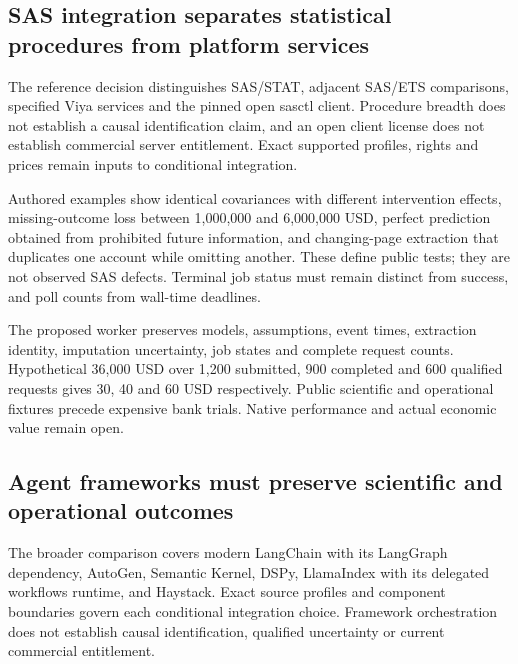 \hypertarget{sas-integration-separates-statistical-procedures-from-platform-services}{%
\subsection{SAS integration separates statistical procedures from
platform
services}\label{sas-integration-separates-statistical-procedures-from-platform-services}}

The reference decision distinguishes SAS/STAT, adjacent SAS/ETS
comparisons, specified Viya services and the pinned open sasctl client.
Procedure breadth does not establish a causal identification claim, and
an open client license does not establish commercial server entitlement.
Exact supported profiles, rights and prices remain inputs to conditional
integration. \citep{exec24_sas_choice}

Authored examples show identical covariances with different intervention
effects, missing-outcome loss between 1,000,000 and 6,000,000 USD,
perfect prediction obtained from prohibited future information, and
changing-page extraction that duplicates one account while omitting
another. These define public tests; they are not observed SAS defects.
Terminal job status must remain distinct from success, and poll counts
from wall-time deadlines. \citep{exec24_sas_choice}

The proposed worker preserves models, assumptions, event times,
extraction identity, imputation uncertainty, job states and complete
request counts. Hypothetical 36,000 USD over 1,200 submitted, 900
completed and 600 qualified requests gives 30, 40 and 60 USD
respectively. Public scientific and operational fixtures precede
expensive bank trials. Native performance and actual economic value
remain open. \citep{exec24_sas_choice}

\hypertarget{agent-frameworks-must-preserve-scientific-and-operational-outcomes}{%
\subsection{Agent frameworks must preserve scientific and operational
outcomes}\label{agent-frameworks-must-preserve-scientific-and-operational-outcomes}}

The broader comparison covers modern LangChain with its LangGraph
dependency, AutoGen, Semantic Kernel, DSPy, LlamaIndex with its
delegated workflows runtime, and Haystack. Exact source profiles and
component boundaries govern each conditional integration choice.
Framework orchestration does not establish causal identification,
qualified uncertainty or current commercial entitlement.
\citep{exec24_framework_contracts}

